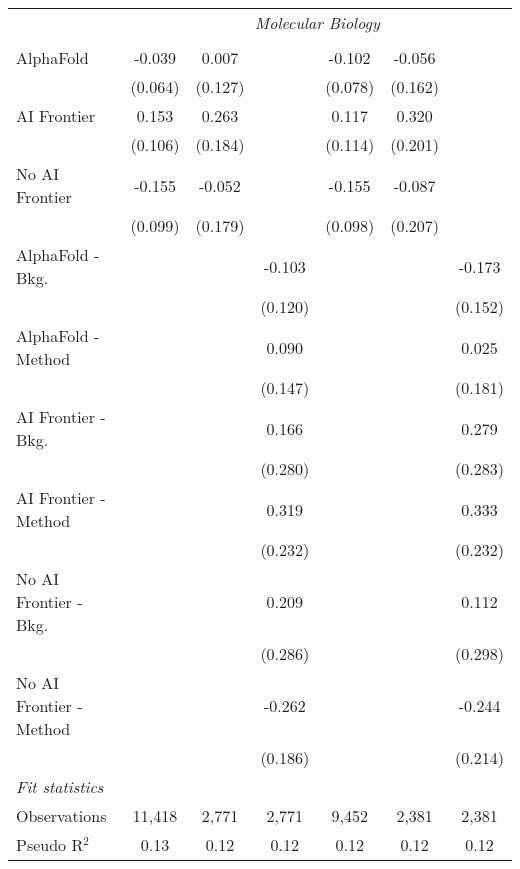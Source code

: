 \begin{tabular}{lcccccc}
 & \multicolumn{6}{c}{\textit{Molecular Biology}} \\ \\
   AlphaFold               & -0.039  & 0.007   &         & -0.102  & -0.056  &   \\   
                           & (0.064) & (0.127) &         & (0.078) & (0.162) &   \\   
   AI Frontier             & 0.153   & 0.263   &         & 0.117   & 0.320   &   \\   
                           & (0.106) & (0.184) &         & (0.114) & (0.201) &   \\   
   No AI Frontier          & -0.155  & -0.052  &         & -0.155  & -0.087  &   \\   
                           & (0.099) & (0.179) &         & (0.098) & (0.207) &   \\   
   AlphaFold - Bkg.        &         &         & -0.103  &         &         & -0.173\\   
                           &         &         & (0.120) &         &         & (0.152)\\   
   AlphaFold - Method      &         &         & 0.090   &         &         & 0.025\\   
                           &         &         & (0.147) &         &         & (0.181)\\   
   AI Frontier - Bkg.      &         &         & 0.166   &         &         & 0.279\\   
                           &         &         & (0.280) &         &         & (0.283)\\   
   AI Frontier - Method    &         &         & 0.319   &         &         & 0.333\\   
                           &         &         & (0.232) &         &         & (0.232)\\   
   No AI Frontier - Bkg.   &         &         & 0.209   &         &         & 0.112\\   
                           &         &         & (0.286) &         &         & (0.298)\\   
   No AI Frontier - Method &         &         & -0.262  &         &         & -0.244\\   
                           &         &         & (0.186) &         &         & (0.214)\\   
   \midrule
   \emph{Fit statistics}\\
   Observations            & 11,418  & 2,771   & 2,771   & 9,452   & 2,381   & 2,381\\  
   Pseudo R$^2$            & 0.13    & 0.12    & 0.12    & 0.12    & 0.12    & 0.12\\  
   

\end{tabular}
